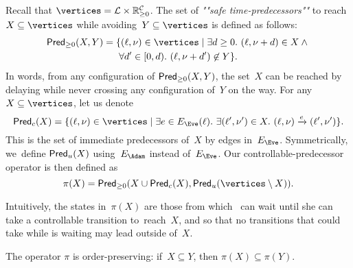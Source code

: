 Recall that $\vertices = \Locs \times \Realnn^\Clocks$.
The set of \emph{""safe time-predecessors""} to reach~$X \subseteq \vertices$ while
avoiding~$Y \subseteq \vertices$
is defined as follows:
\begin{multline*}
\predt(X,Y) = \{(\ell,\nu) \in \vertices \mid \exists d\geq
    0.\ (\ell,\nu+d) \in X \wedge{} \\
    \forall d' \in[0,d).\ (\ell,\nu+d') \not  \in Y\}.
\end{multline*}
In words, from any configuration of $\textrm{\sf Pred}_{\geq 0}(X,Y)$,
the set~$X$ can be reached by
delaying while never crossing any configuration of~$Y$ on the way. 
For any $X \subseteq \vertices$, let us denote
\[
  \predc(X) = \{ (\ell,\nu) \in \vertices \mid \exists e \in \EE(\ell).\ 
\exists (\ell',\nu') \in X.\ (\ell,\nu) \xrightarrow{e} (\ell',\nu')\}.
\]
This is the set of immediate predecessors of~$X$ by edges in~$\EE$.
Symmetrically, we~define $\textrm{\sf Pred}_u(X)$ using~$\EA$ instead of~$\EE$.
Our controllable-predecessor operator is then defined as 
%
\[
  \pi(X) = \predt(X\cup \predc(X), \predu(\vertices \setminus X)).
\]

Intuitively, the states in~$\pi(X)$ are those from which \Eve~can wait
until she
can take a controllable transition to~reach~$X$, and so that
no transitions that \Adam could take while \Eve is waiting may lead
outside of~$X$.

\begin{lemma}\label{10-lem:pimonotonic}
  The operator $\pi$ is %
  order-preserving: if~$X\subseteq Y$, then
  $\pi(X) \subseteq \pi(Y)$.  %
\end{lemma}

